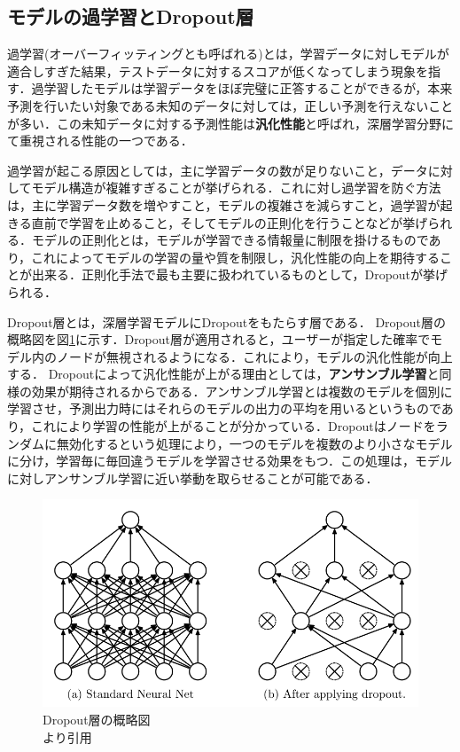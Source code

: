\documentclass[a4j, 11pt]{jreport}
\begin{document}
\subsection{モデルの過学習とDropout層}
過学習(オーバーフィッティングとも呼ばれる)とは，学習データに対しモデルが適合しすぎた結果，テストデータに対するスコアが低くなってしまう現象を指す．過学習したモデルは学習データをほぼ完璧に正答することができるが，本来予測を行いたい対象である未知のデータに対しては，正しい予測を行えないことが多い．この未知データに対する予測性能は\textbf{汎化性能}と呼ばれ，深層学習分野にて重視される性能の一つである．

過学習が起こる原因としては，主に学習データの数が足りないこと，データに対してモデル構造が複雑すぎることが挙げられる．これに対し過学習を防ぐ方法は，主に学習データ数を増やすこと，モデルの複雑さを減らすこと，過学習が起きる直前で学習を止めること，そしてモデルの正則化を行うことなどが挙げられる．モデルの正則化とは，モデルが学習できる情報量に制限を掛けるものであり，これによってモデルの学習の量や質を制限し，汎化性能の向上を期待することが出来る．正則化手法で最も主要に扱われているものとして，Dropout\cite{Srivastava2014}が挙げられる．

Dropout層とは，深層学習モデルにDropoutをもたらす層である．
Dropout層の概略図を図\ref{fig:dropout}に示す．Dropout層が適用されると，ユーザーが指定した確率でモデル内のノードが無視されるようになる．これにより，モデルの汎化性能が向上する．
Dropoutによって汎化性能が上がる理由としては，\textbf{アンサンブル学習}と同様の効果が期待されるからである．アンサンブル学習とは複数のモデルを個別に学習させ，予測出力時にはそれらのモデルの出力の平均を用いるというものであり，これにより学習の性能が上がることが分かっている．Dropoutはノードをランダムに無効化するという処理により，一つのモデルを複数のより小さなモデルに分け，学習毎に毎回違うモデルを学習させる効果をもつ．この処理は，モデルに対しアンサンブル学習に近い挙動を取らせることが可能である．

\begin{figure}[H]
 \centering
 \includegraphics[width=0.8\hsize, keepaspectratio]{images/dropout.png}
 \caption{Dropout層の概略図\\\cite{Srivastava2014}より引用}
 \label{fig:dropout}
\end{figure}
\end{document}
